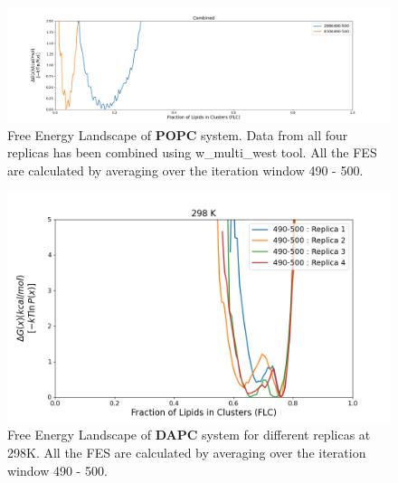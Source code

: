 \documentclass{biophys-new}
\begin{document}
\begin{figure}[hbt!]
\centering
\includegraphics[width=1.1\linewidth]{all_plots/ClusterLipids2Total/DPPC_POPC_CHOL/Average_POPC_MULTI__ClusterLipids2Total.png}
\caption{Free Energy Landscape of \textbf{POPC} system. Data from all four replicas has been combined using w\_multi\_west tool. All the FES are calculated by averaging over the iteration window 490 - 500.}
\label{fig:view}

\end{figure}

\begin{figure}[hbt!]
\centering
\includegraphics[width=1.1\linewidth]{all_plots/ClusterLipids2Total/DPPC_DAPC_CHOL/298K/Average_DAPC_298_ClusterLipids2Total.png}
\caption{Free Energy Landscape of \textbf{DAPC} system for different replicas at 298K. All the FES are calculated by averaging over the iteration window 490 - 500.}
\label{fig:view}

\end{figure}
\end{document}
